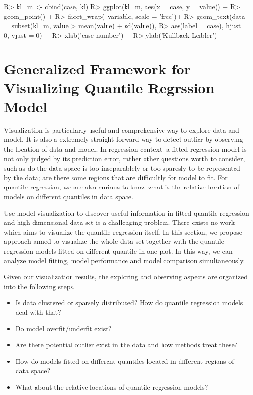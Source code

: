 \documentclass[article]{jss}
\theoremstyle{definition}
\theoremstyle{definition}
\theoremstyle{remark}
\begin{document}
\begin{CodeChunk}

\begin{CodeInput}
R> kl_m <- cbind(case, kl)
R> ggplot(kl_m, aes(x = case, y = value)) +
R>   geom_point() +
R>   facet_wrap(~variable, scale = 'free')+
R>   geom_text(data = subset(kl_m, value > mean(value) + sd(value)),
R>             aes(label = case), hjust = 0, vjust = 0) +
R>   xlab('case number') +
R>   ylab('Kullback-Leibler')
\end{CodeInput}
\end{CodeChunk}

\section{Generalized Framework for Visualizing Quantile Regrssion
Model}\label{generalized-framework-for-visualizing-quantile-regrssion-model}

Visualization is particularly useful and comprehensive way to explore
data and model. It is also a extremely straight-forward way to detect
outlier by observing the location of data and model. In regression
context, a fitted regression model is not only judged by its prediction
error, rather other questions worth to consider, such as do the data
space is too inseparablely or too sparesly to be represented by the
data; are there some regions that are difficultly for model to fit. For
quantile regression, we are also curious to know what is the relative
location of models on different quantiles in data space.

Use model visualization to discover useful information in fitted
quantile regression and high dimensional data set is a challenging
problem. There exists no work which aims to visualize the quantile
regression itself. In this section, we propose approach aimed to
visualize the whole data set together with the quantile regression
models fitted on different quantile in one plot. In this way, we can
analyze model fitting, model performance and model comparison
simultaneously.

Given our visualization results, the exploring and observing aspects are
organized into the following steps.

\begin{itemize}
\item
  Is data clustered or sparsely distributed? How do quantile regression
  models deal with that?
\item
  Do model overfit/underfit exist?
\item
  Are there potential outlier exist in the data and how methods treat
  these?
\item
  How do models fitted on different quantiles located in different
  regions of data space?
\item
  What about the relative locations of quantile regression models?
\end{itemize}
\end{document}
